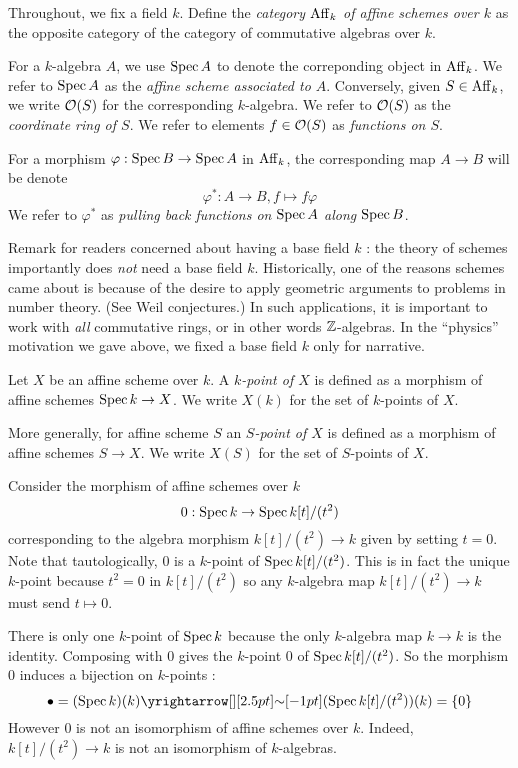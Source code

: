 \documentclass[./main.tex]{subfiles}
\begin{document}
\begin{dfn}
  
  Throughout, we fix a field $k$.
  Define the \emph{category $\mathrm{Aff}_k$ of affine schemes over $k$}
  as the opposite category of the category of
  commutative algebras over $k$.

  For a $k$-algebra $A$,
  we use $\operatorname{Spec} A$ to denote the correponding object in $\mathrm{Aff}_k$.
  We refer to $\operatorname{Spec} A$ as the \emph{affine scheme associated to $A$}.
  Conversely, given $S \in \mathrm{Aff}_k$,
  we write $\mathcal{O}(S)$ for the corresponding $k$-algebra.
  We refer to $\mathcal{O}(S)$ as the \emph{coordinate ring of $S$}.
  We refer to elements $f \in \mathcal{O}(S)$ as
  \emph{functions on $S$}.

  For a morphism $\varphi : \operatorname{Spec} B \to \operatorname{Spec} A$ in $\mathrm{Aff}_k$,
  the corresponding map $A \to B$ will be denote \[
    \varphi^* : A \to B , f \mapsto f \varphi  
  \]
  We refer to $\varphi^*$ as 
  \emph{pulling back functions on $\operatorname{Spec} A$ along $\operatorname{Spec} B$}.
\end{dfn}

Remark for readers concerned about having a base field $k$ : 
the theory of schemes importantly does \emph{not}
need a base field $k$.
Historically, one of the reasons schemes
came about is because of the desire to apply
geometric arguments to problems in number theory.
(See Weil conjectures.)
In such applications, it is important to work with
\emph{all} commutative rings,
or in other words $\mathbb{Z}$-algebras.
In the ``physics'' motivation we gave above,
we fixed a base field $k$ only for narrative.

\begin{dfn}
  
  Let $X$ be an affine scheme over $k$.
  A \emph{$k$-point of $X$} is defined as
  a morphism of affine schemes $\operatorname{Spec} k \to X$.
  We write $X(k)$ for the set of $k$-points of $X$.

  More generally, for affine scheme $S$
  an \emph{$S$-point of $X$} is defined as
  a morphism of affine schemes $S \to X$.
  We write $X(S)$ for the set of $S$-points of $X$.
\end{dfn}

\begin{eg}
  
  Consider the morphism of affine schemes over $k$
  \[
    0 : \operatorname{Spec} k \to \operatorname{Spec} k[t] / (t^2)
  \] corresponding to
  the algebra morphism $k[t] / (t^2) \to k$ given by
  setting $t = 0$.
  Note that tautologically, $0$ is a $k$-point of $\operatorname{Spec} k[t]/(t^2)$.
  This is in fact the unique $k$-point because
  $t^2 = 0$ in $k[t]/(t^2)$ so
  any $k$-algebra map $k[t]/(t^2) \to k$ must send $t \mapsto 0$.

  There is only one $k$-point of $\operatorname{Spec} k$
  because the only $k$-algebra map $k \to k$ is the identity.
  Composing with $0$ gives the $k$-point $0$ of $\operatorname{Spec} k[t] / (t^2)$.
  So the morphism $0$ induces a bijection on $k$-points : 
  \[
    \bullet = (\SPEC k)(k) \map{\sim}{} (\SPEC k[t]/(t^2))(k) = \set{0}
  \]
  However $0$ is not an isomorphism of affine schemes over $k$.
  Indeed, $k[t]/(t^2) \to k$ is not an isomorphism of $k$-algebras.

\end{eg}
\end{document}
